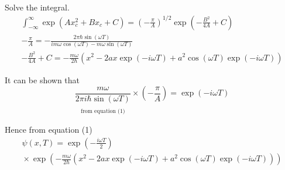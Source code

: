 \documentclass[12pt]{article}
\begin{document}
Solve the integral.
\begin{gather*}
\int_{-\infty}^\infty\exp(Ax_c^2+Bx_c+C)
=\left(-\frac{\pi}{A}\right)^{1/2}
\exp\left(-\frac{B^2}{4A}+C\right)
\\
-\frac{\pi}{A}
=-\frac{2\pi\hbar\sin(\omega T)}{im\omega\cos(\omega T)-m\omega\sin(\omega T)}
\tag{5}
\\
-\frac{B^2}{4A}+C
=-\frac{m\omega}{2\hbar}
\left(x^2-2ax\exp(-i\omega T)+a^2\cos(\omega T)\exp(-i\omega T)\right)
\tag{6}
\end{gather*}

It can be shown that
\begin{equation*}
\underset{\substack{\\[1ex]\text{from equation (1)}}}
{\frac{m\omega}{2\pi i\hbar\sin(\omega T)}}
\times
\left(-\frac{\pi}{A}\right)
=\exp(-i\omega T)
\tag{7}
\end{equation*}

Hence from equation (1)
\begin{multline*}
\psi(x,T)=\exp\left(-\frac{i\omega T}{2}\right)
\\
{}\times\exp\left(
-\frac{m\omega}{2\hbar}
\left(x^2-2ax\exp(-i\omega T)+a^2\cos(\omega T)\exp(-i\omega T)\right)
\right)
\end{multline*}
\end{document}
